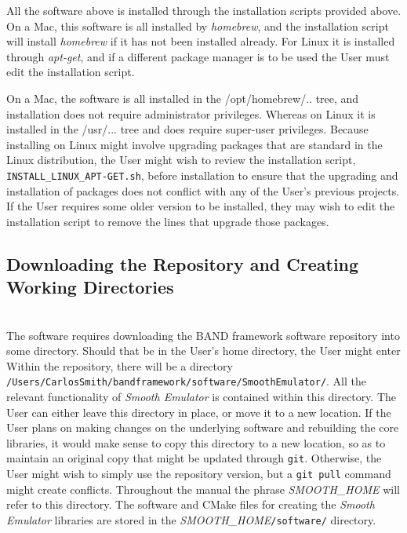 \documentclass[UserManual.tex]{subfiles}
\begin{document}
\begin{sloppypar}
All the software above is installed through the installation scripts provided above. On a Mac, this software is all installed by {\it homebrew}, and the installation script will install {\it homebrew} if it has not been installed already. For Linux it is installed through {\it apt-get}, and if a different package manager is to be used the User must edit the installation script. 

On a Mac, the software is all installed in the {/opt/homebrew/..} tree, and installation does not require administrator privileges. Whereas on Linux it is installed in the {/usr/...} tree and does require super-user privileges. Because installing on Linux might involve upgrading packages that are standard in the Linux distribution, the User might wish to review the installation script, {\tt INSTALL\_LINUX\_APT-GET.sh}, before installation to ensure that the upgrading and installation of packages does not conflict with any of the User's previous projects. If the User requires some older version to be installed, they may wish to edit the installation script to remove the lines that upgrade those packages.

\subsection{Downloading the Repository and Creating Working Directories}\label{subsec:download}

\\
The software requires downloading the BAND framework software repository into some directory. Should that be in the User's home directory, the User might enter
\vspace*{-8pt}{\tt \begin{Verbatim}[commandchars=\\\{\}]
/Users/CarlosSmith% \textcolor{darkred}{git clone https://github.com/bandframework/SmoothEmulator.git}
\end{Verbatim}
}\vspace*{-8pt}
Within the repository, there will be a directory\\{\tt /Users/CarlosSmith/bandframework/software/SmoothEmulator/}. All the relevant functionality of {\it Smooth Emulator} is contained within this directory. The User can either leave this directory in place, or move it to a new location. If the User plans on making changes on the underlying software and rebuilding the core libraries, it would make sense to copy this directory to a new location, so as to maintain an original copy that might be updated through {\tt git}. Otherwise, the User might wish to simply use the repository version, but a {\tt git pull} command might create conflicts. Throughout the manual the phrase \textit{SMOOTH\_HOME} will refer to this directory. The software and CMake files for creating the {\it Smooth Emulator} libraries are stored in the \textit{SMOOTH\_HOME}{\tt /software/} directory.


\end{sloppypar}
\end{document}
